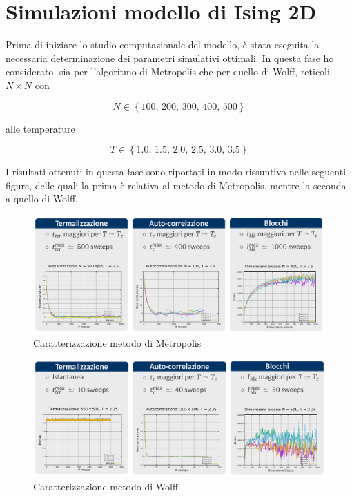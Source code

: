 \section{Simulazioni modello di Ising 2D}

Prima di iniziare lo studio computazionale del modello, è stata eseguita la necessaria determinazione dei 
parametri simulativi ottimali. In questa fase ho considerato, sia per l'algoritmo di Metropolis che per quello 
di Wolff, reticoli $N \times N$ con 

$$
N \in \left\{100,\,200,\,300,\,400,\,500\right\}
$$

alle temperature

$$
T \in \left\{1.0,\,1.5,\,2.0,\,2.5,\,3.0,\,3.5\right\}
$$

I risultati ottenuti in questa fase sono riportati in modo rissuntivo nelle seguenti figure, delle quali la 
prima è relativa al metodo di Metropolis, mentre la seconda a quello di Wolff.

\begin{figure}[H]
    \centering
    \includegraphics[width=\textwidth]{Immagini/simIsing2D/carMetro.png}
    \caption{Caratterizzazione metodo di Metropolis}
    \label{fig: car_metro}
\end{figure}

\begin{figure}[H]
    \centering
    \includegraphics[width=\textwidth]{Immagini/simIsing2D/carWolff.png}
    \caption{Caratterizzazione metodo di Wolff}
    \label{fig: car_wolff}
\end{figure}





